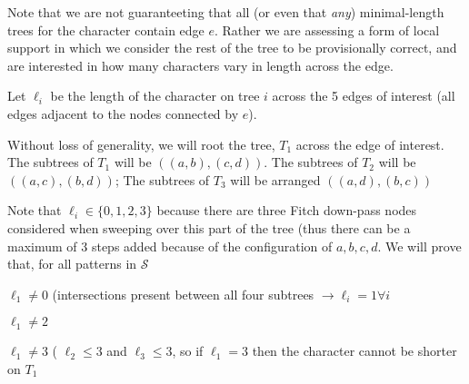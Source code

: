 \documentclass[11pt]{article}
\begin{document}
Note that we are not guaranteeting that all (or even that {\em any}) minimal-length trees  for the character contain edge $e$. 
Rather we are assessing a form of local support in which we consider the rest of the tree to be provisionally correct, and are interested in how many characters vary in length across the edge.


Let $\ell_i$ be the length of the character on tree $i$ across the 5 edges of interest (all edges adjacent to the nodes connected by $e$).

Without loss of generality, we will root the tree, $T_1$ across the edge of interest.
The subtrees of $T_1$ will be $((a,b),(c,d))$. The subtrees of $T_2$ will be $((a,c),(b,d))$; The subtrees of $T_3$ will be arranged $((a,d),(b,c))$




Note that $\ell_i \in \{0, 1, 2, 3\}$ because there are three Fitch down-pass nodes considered when sweeping over this part of the tree (thus there can be a maximum of 3 steps added because of the configuration of $a,b,c,d$.
We will prove that, for all patterns in $\mathcal{S}$
\begin{compactenum}
	\item  $\ell_1 \neq 0$  (intersections present between all four subtrees $\rightarrow \ell_i = 1 \forall i$
	\item  $\ell_1 \neq 2$
	\item  $\ell_1 \neq 3$ ( $\ell_2 \leq 3$ and $\ell_3 \leq 3$, so if $\ell_1=3$ then the character cannot be shorter on $T_1$
\end{compactenum}


\end{document}
